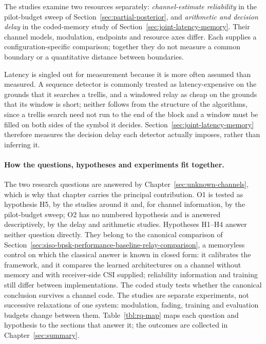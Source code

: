 The studies examine two resources separately: \emph{channel-estimate reliability} in the pilot-budget sweep of Section~\ref{sec:partial-posterior}, and \emph{arithmetic and decision delay} in the coded-memory study of Section~\ref{sec:joint-latency-memory}. Their channel models, modulation, endpoints and resource axes differ. Each supplies a configuration-specific comparison; together they do not measure a common boundary or a quantitative distance between boundaries.

Latency is singled out for measurement because it is more often assumed than measured. A sequence detector is commonly treated as latency-expensive on the grounds that it searches a trellis, and a windowed relay as cheap on the grounds that its window is short; neither follows from the structure of the algorithms, since a trellis search need not run to the end of the block and a window must be filled on both sides of the symbol it decides. Section~\ref{sec:joint-latency-memory} therefore measures the decision delay each detector actually imposes, rather than inferring it.

\paragraph{How the questions, hypotheses and experiments fit together.} The two research questions are answered by Chapter~\ref{sec:unknown-channels}, which is why that chapter carries the principal contribution. O1 is tested as hypothesis H5, by the studies around it and, for channel information, by the pilot-budget sweep; O2 has no numbered hypothesis and is answered descriptively, by the delay and arithmetic studies. Hypotheses H1--H4 answer neither question directly. They belong to the canonical comparison of Section~\ref{sec:siso-bpsk-performance-baseline-relay-comparison}, a memoryless control on which the classical answer is known in closed form: it calibrates the framework, and it compares the learned architectures on a channel without memory and with receiver-side CSI supplied; reliability information and training still differ between implementations. The coded study tests whether the canonical conclusion survives a channel code. The studies are separate experiments, not successive relaxations of one system: modulation, fading, training and evaluation budgets change between them. Table~\ref{tbl:rq-map} maps each question and hypothesis to the sections that answer it; the outcomes are collected in Chapter~\ref{sec:summary}.

